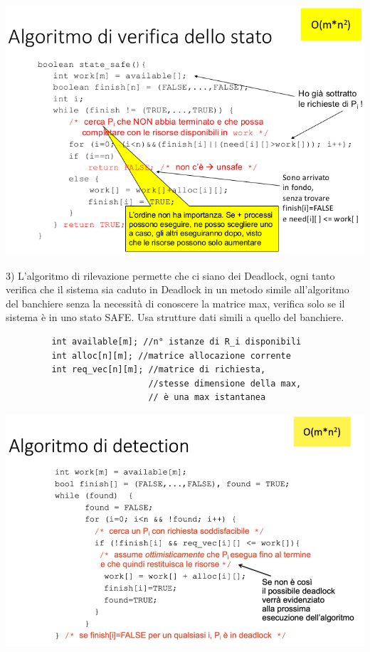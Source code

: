 \documentclass[a4paper, 12pt]{book}
\begin{document}
\begin{center}
    \includegraphics[width=1\textwidth]{banchiere2.png}
\end{center}
3) L'algoritmo di rilevazione permette che ci siano dei Deadlock, ogni tanto verifica che il sistema sia caduto in Deadlock
 in un metodo simile all'algoritmo del banchiere senza la necessità di conoscere la matrice max, verifica solo se il sistema è in 
 uno stato SAFE. Usa strutture dati simili a quello del banchiere.
 \begin{center}
     \begin{verbatim}
         int available[m]; //n° istanze di R_i disponibili
         int alloc[n][m]; //matrice allocazione corrente
         int req_vec[n][m]; //matrice di richiesta,
                            //stesse dimensione della max,
                            // è una max istantanea
     \end{verbatim}
 \end{center}
 \begin{center}
     \includegraphics[width=1\textwidth]{detection.png}
 \end{center}
\end{document}
